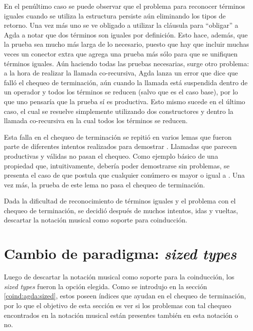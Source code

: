 
En el penúltimo caso se puede observar que el problema para reconocer términos iguales cuando se utiliza la estructura  persiste aún eliminando los tipos de retorno. Una vez más uno se ve obligado a utilizar la cláusula  para ``obligar'' a Agda a notar que dos términos son iguales por definición. Esto hace, además, que la prueba sea mucho más larga de lo necesario, puesto que hay que incluir muchas veces un conector  extra que agrega una prueba más sólo para que se unifiquen términos iguales. Aún haciendo todas las pruebas necesarias, surge otro problema: a la hora de realizar la llamada co-recursiva, Agda lanza un error que dice que falló el chequeo de terminación, aún cuando la llamada está suspendida dentro de un operador \AgdaCoinductiveConstructor{$\sharp$} y todos los términos se reducen (salvo  que es el caso base), por lo que uno pensaría que la prueba sí es productiva. Esto mismo sucede en el último caso, el cual se resuelve simplemente utilizando dos constructores  y dentro la llamada co-recursiva en la cual todos los términos se reducen. 

Esta falla en el chequeo de terminación se repitió en varios lemas que fueron parte de diferentes intentos realizados para demostrar . Llamadas que parecen productivas y válidas no pasan el chequeo. Como ejemplo básico de una propiedad que, intuitivamente, debería poder demostrarse sin problemas, se presenta el caso de  que postula que cualquier conúmero es mayor o igual a . Una vez más, la prueba de este lema no pasa el chequeo de terminación.


Dada la dificultad de reconocimiento de términos iguales y el problema con el chequeo de terminación, se decidió después de muchos intentos, idas y vueltas, descartar la notación musical como soporte para coinducción.

\section{Cambio de paradigma: \textit{sized types}}\label{casodelay:sized}

Luego de descartar la notación musical como soporte para la coinducción, los \textit{sized types} fueron la opción elegida. Como se introdujo en la sección \ref{coind:agda:sized}, estos poseen índices que ayudan en el chequeo de terminación, por lo que el objetivo de esta sección es ver si los problemas con tal chequeo encontrados en la notación musical están presentes también en esta notación o no. 

